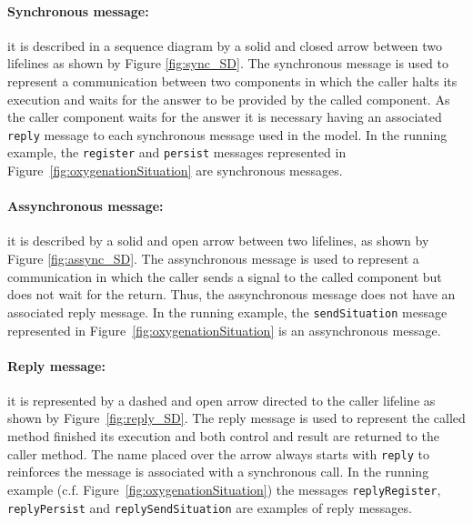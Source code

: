 \paragraph{Synchronous message: \label{par:syncMessageModeling}} it is described
in a sequence diagram by a solid and closed arrow between two lifelines as shown
by Figure \ref{fig:sync_SD}.  The synchronous message is used to represent a
communication between two components in which the caller halts its execution and
waits for the answer to be provided by the called component. As the caller
component waits for the answer it is necessary having an associated \texttt{reply}
message to each synchronous message used in the model. In the running example,
the \texttt{register} and \texttt{persist} messages represented in
Figure~\ref{fig:oxygenationSituation} are synchronous messages.


\paragraph{Assynchronous message: \label{par:assyncMessageModeling}} it is
described by a solid and open arrow between two lifelines, as shown by Figure
\ref{fig:assync_SD}.  The assynchronous message is used to represent a
communication in which the caller sends a signal to the called component but
does not wait for the return. Thus, the assynchronous message does not have an
associated reply message. In the running example, the \texttt{sendSituation}
message represented in Figure~\ref{fig:oxygenationSituation} is an assynchronous message.



\paragraph{Reply message: \label{par:replyMessageModeling}} it is represented by
a dashed and open arrow directed to the caller lifeline as shown by
Figure~\ref{fig:reply_SD}.  The reply message is used to represent the called
method finished its execution and both control and  result are returned to the caller method.
The name placed over the arrow always starts with \texttt{reply} to
reinforces the message is associated with a synchronous call. In the running
example (c.f. Figure~\ref{fig:oxygenationSituation}) the messages \texttt{replyRegister}, \texttt{replyPersist} and
\texttt{replySendSituation} are examples of reply messages.

